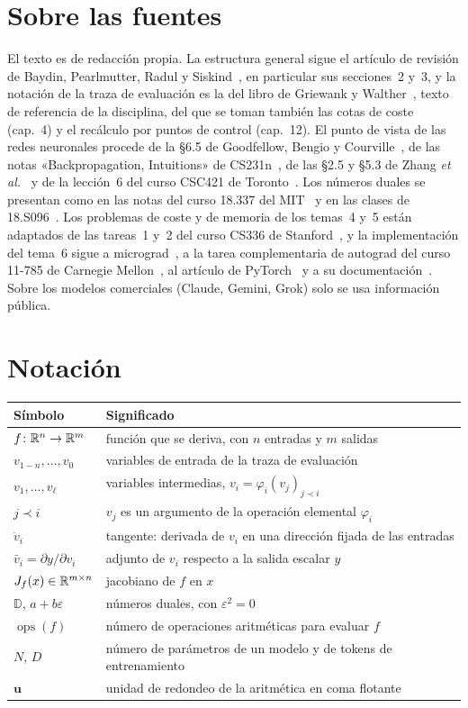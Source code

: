 \documentclass[11pt,a4paper,twoside,openany]{book}
\newcommand{\Du}{\mathbb{D}}
\newcommand{\ops}{\operatorname{ops}}
\newcommand{\pre}{\prec}
\newcommand{\uep}{\mathbf{u}}
\begin{document}
\section*{Sobre las fuentes}
El texto es de redacción propia. La estructura general sigue el artículo de revisión de Baydin, Pearlmutter, Radul y Siskind~\cite{baydin}, en particular sus secciones~2 y~3, y la notación de la traza de evaluación es la del libro de Griewank y Walther~\cite{gw}, texto de referencia de la disciplina, del que se toman también las cotas de coste (cap.~4) y el recálculo por puntos de control (cap.~12). El punto de vista de las redes neuronales procede de la §6.5 de Goodfellow, Bengio y Courville~\cite{gbc}, de las notas «Backpropagation, Intuitions» de CS231n~\cite{cs231n}, de las §2.5 y §5.3 de Zhang \emph{et al.}~\cite{d2l} y de la lección~6 del curso CSC421 de Toronto~\cite{grosse}. Los números duales se presentan como en las notas del curso 18.337 del MIT~\cite{mit18337} y en las clases de 18.S096~\cite{mit18s096}. Los problemas de coste y de memoria de los temas~4 y~5 están adaptados de las tareas~1 y~2 del curso CS336 de Stanford~\cite{cs336a1,cs336a2}, y la implementación del tema~6 sigue a micrograd~\cite{karpathy}, a la tarea complementaria de autograd del curso 11-785 de Carnegie Mellon~\cite{cmu11785}, al artículo de PyTorch~\cite{paszke} y a su documentación~\cite{pytorch}. Sobre los modelos comerciales (Claude, Gemini, Grok) solo se usa información pública.

\section*{Notación}
\begin{center}\small
\begin{tabular}{@{}ll@{}}
\toprule
Símbolo & Significado \\
\midrule
$f\colon\mathbb{R}^{n}\to\mathbb{R}^{m}$ & función que se deriva, con $n$ entradas y $m$ salidas \\
$v_{1-n},\dots,v_0$ & variables de entrada de la traza de evaluación \\
$v_1,\dots,v_\ell$ & variables intermedias, $v_i=\varphi_i(v_j)_{j\pre i}$ \\
$j\pre i$ & $v_j$ es un argumento de la operación elemental $\varphi_i$ \\
$\dot v_i$ & tangente: derivada de $v_i$ en una dirección fijada de las entradas \\
$\bar v_i=\partial y/\partial v_i$ & adjunto de $v_i$ respecto a la salida escalar $y$ \\
$J_f(x)\in\mathbb{R}^{m\times n}$ & jacobiano de $f$ en $x$ \\
$\Du$, $a+b\varepsilon$ & números duales, con $\varepsilon^{2}=0$ \\
$\ops(f)$ & número de operaciones aritméticas para evaluar $f$ \\
$N$, $D$ & número de parámetros de un modelo y de tokens de entrenamiento \\
$\uep$ & unidad de redondeo de la aritmética en coma flotante \\
\bottomrule
\end{tabular}
\end{center}
\end{document}
